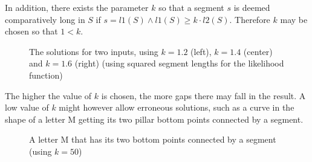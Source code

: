 \documentclass[11pt]{article}
\begin{document}
In addition, there exists the parameter $k$ so that a segment $s$ is deemed comparatively long in $S$ if $s = l1(S) \wedge l1(S) \geq k \cdot l2(S)$. Therefore $k$ may be chosen so that $1 < k$.

\begingroup
{}%
\begin{figure}[ht!]
\centering
\begin{subfigure}{.16\linewidth}
\centering

\label{fig:exp:single_parameter_b:first}
\end{subfigure}%
\begin{subfigure}{.16\linewidth}
\centering

\label{fig:exp:single_parameter_b:second}
\centering
\end{subfigure}
\begin{subfigure}{.16\linewidth}
\centering

\label{fig:exp:single_parameter_b:third}
\end{subfigure}%
\begin{subfigure}{.16\linewidth}
\centering

\label{fig:exp:single_parameter_b:fourth}
\centering
\end{subfigure}
\begin{subfigure}{.16\linewidth}
\centering

\label{fig:exp:single_parameter_b:fifth}
\end{subfigure}%
\begin{subfigure}{.16\linewidth}
\centering

\label{fig:exp:single_parameter_b:sixth}
\centering
\end{subfigure}
\caption{The solutions for two inputs, using $k = 1.2$ (left), $k = 1.4$ (center) and $k = 1.6$ (right) (using squared segment lengths for the likelihood function)}
\end{figure}
\endgroup

The higher the value of $k$ is chosen, the more gaps there may fall in the result. A low value of $k$ might however allow erroneous solutions, such as a curve in the shape of a letter M getting its two pillar bottom points connected by a segment.

\begingroup
{}%
\begin{figure}[ht!]
\begin{subfigure}{.5\linewidth}
\centering

\label{fig:exp:single_parameter_c:first}
\end{subfigure}%
\begin{subfigure}{.5\linewidth}
\centering

\label{fig:exp:single_parameter_c:second}
\end{subfigure}%
\caption{A letter M that has its two bottom points connected by a segment (using $k = 50$)}
\end{figure}
\endgroup
\end{document}
